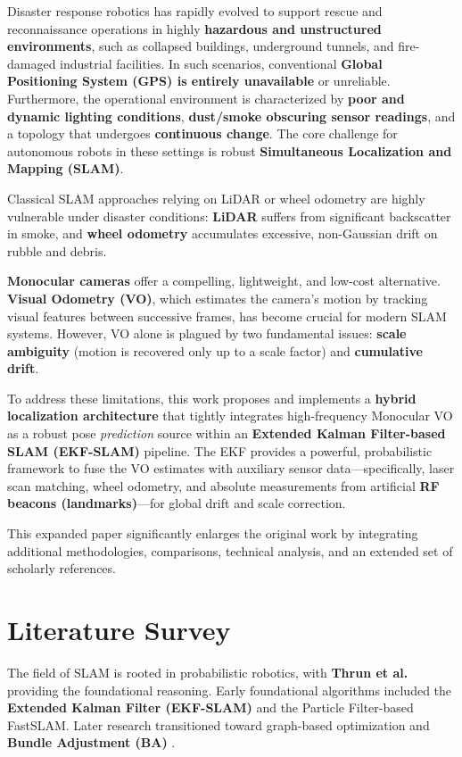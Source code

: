 \documentclass[conference]{IEEEtran}
\begin{document}
Disaster response robotics has rapidly evolved to support rescue and reconnaissance operations in highly \textbf{hazardous and unstructured environments}, such as collapsed buildings, underground tunnels, and fire-damaged industrial facilities. In such scenarios, conventional \textbf{Global Positioning System (GPS) is entirely unavailable} or unreliable. Furthermore, the operational environment is characterized by \textbf{poor and dynamic lighting conditions}, \textbf{dust/smoke obscuring sensor readings}, and a topology that undergoes \textbf{continuous change}. The core challenge for autonomous robots in these settings is robust \textbf{Simultaneous Localization and Mapping (SLAM)}.

Classical SLAM approaches relying on LiDAR or wheel odometry are highly vulnerable under disaster conditions: \textbf{LiDAR} suffers from significant backscatter in smoke, and \textbf{wheel odometry} accumulates excessive, non-Gaussian drift on rubble and debris.

\textbf{Monocular cameras} offer a compelling, lightweight, and low-cost alternative. \textbf{Visual Odometry (VO)}, which estimates the camera's motion by tracking visual features between successive frames, has become crucial for modern SLAM systems. However, VO alone is plagued by two fundamental issues: \textbf{scale ambiguity} (motion is recovered only up to a scale factor) and \textbf{cumulative drift}.

To address these limitations, this work proposes and implements a \textbf{hybrid localization architecture} that tightly integrates high-frequency Monocular VO as a robust pose \textit{prediction} source within an \textbf{Extended Kalman Filter-based SLAM (EKF-SLAM)} pipeline. The EKF provides a powerful, probabilistic framework to fuse the VO estimates with auxiliary sensor data—specifically, laser scan matching, wheel odometry, and absolute measurements from artificial \textbf{RF beacons (landmarks)}—for global drift and scale correction.

This expanded paper significantly enlarges the original work by integrating additional methodologies, comparisons, technical analysis, and an extended set of scholarly references.

\section{Literature Survey}

The field of SLAM is rooted in probabilistic robotics, with \textbf{Thrun et al. \cite{Thrun2005}} providing the foundational reasoning. Early foundational algorithms included the \textbf{Extended Kalman Filter (EKF-SLAM)} and the Particle Filter-based FastSLAM. Later research transitioned toward graph-based optimization and \textbf{Bundle Adjustment (BA)} \cite{Triggs2000}.
\end{document}
